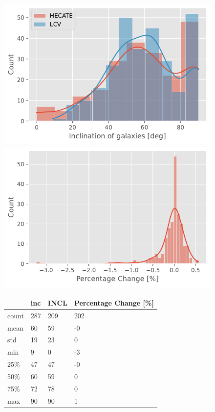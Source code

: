 \documentclass[
]{article}
\begin{document}
\begin{figure}

\begin{minipage}{0.50\linewidth}
\includegraphics{compare_files/figure-pdf/cell-29-output-1.pdf}\end{minipage}%
%
\begin{minipage}{0.50\linewidth}
\includegraphics{compare_files/figure-pdf/cell-29-output-2.pdf}\end{minipage}%
\newline
\begin{minipage}{\linewidth}

\begin{longtable}[]{@{}llll@{}}
\toprule\noalign{}
& inc & INCL & Percentage Change {[}\%{]} \\
\midrule\noalign{}
\endhead
\bottomrule\noalign{}
\endlastfoot
count & 287 & 209 & 202 \\
mean & 60 & 59 & -0 \\
std & 19 & 23 & 0 \\
min & 9 & 0 & -3 \\
25\% & 47 & 47 & -0 \\
50\% & 60 & 59 & 0 \\
75\% & 72 & 78 & 0 \\
max & 90 & 90 & 1 \\
\end{longtable}

\end{minipage}%

\end{figure}%
\end{document}
